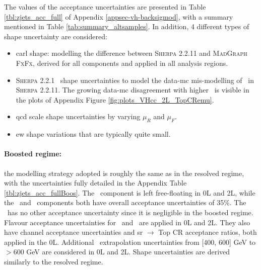 The values of the acceptance uncertainties are presented in Table \ref{tbl:zjets_acc_full} of Appendix \ref{appsec-vh-backsigmod}, with a summary mentioned in Table \ref{tab:summary_altsamples}. In addition, 4 different types of shape uncertainty are considered:
\begin{itemize}
    \item \gls{carl} shape: modelling the difference between \textsc{Sherpa} 2.2.11 and \textsc{MadGraph FxFx}, derived for all components and applied in all analysis regions.
    \item \textsc{Sherpa} 2.2.1 \ptv\ shape uncertainties to model the data-\gls{mc} mis-modelling of \ptv\ in \textsc{Sherpa} 2.2.11. The growing data-\gls{mc} disagreement with higher \ptv\ is visible in the plots of Appendix Figure \ref{fig:plots_VHcc_2L_TopCRemu}.
    \item \gls{qcd} scale shape uncertainties by varying $\mu_R$ and $\mu_F$.
    \item \gls{ew} shape variations that are typically quite small.
\end{itemize}  %

\paragraph{Boosted regime:} the modelling strategy adopted is roughly the same as in the resolved regime, with the uncertainties fully detailed in the Appendix Table \ref{tbl:zjets_acc_fullBoos}. The \zhf\ component is left free-floating in 0L and 2L, while the \zmf\ and \zlf\ components both have overall acceptance uncertainties of 35\%. The \zlf\ has no other acceptance uncertainty since it is negligible in the boosted regime. Flavour acceptance uncertainties for \zhf\ and \zmf\ are applied in 0L and 2L. They also have channel acceptance uncertainties and \gls{sr} $\rightarrow$ Top CR acceptance ratios, both applied in the 0L. Additional \ptv\ extrapolation uncertainties from [400, 600] GeV to $> 600$ GeV are considered in 0L and 2L. Shape uncertainties are derived similarly to the resolved regime. 

